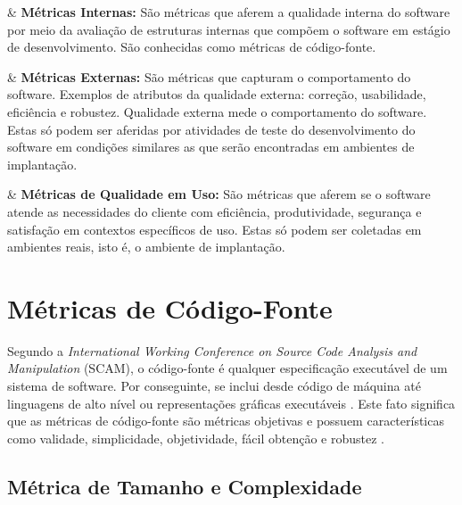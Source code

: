 \begin{easylist}[itemize]
	
		& \textbf{Métricas Internas:} 
		São métricas que aferem a qualidade interna do software por meio da 
		avaliação de estruturas internas que compõem o software em estágio de 
		desenvolvimento. São conhecidas como métricas de código-fonte.

		& \textbf{Métricas Externas:}
		São métricas que capturam o comportamento do software. Exemplos de 
		atributos da qualidade externa: correção, usabilidade, eficiência e 
		robustez. Qualidade externa mede o comportamento do software. Estas só 
		podem ser aferidas por atividades de teste do desenvolvimento do 
		software em condições similares as que serão encontradas em ambientes de
		implantação.

		& \textbf{Métricas de Qualidade em Uso:}
		São métricas que aferem se o software atende as necessidades do cliente
		com eficiência, produtividade, segurança e satisfação em contextos 
		específicos de uso. Estas só podem ser coletadas em ambientes reais, 
		isto é, o ambiente de implantação.	
			 
\end{easylist}
		
				

\section {Métricas de Código-Fonte}
\label{sec:source-code}

Segundo a \textit{International Working Conference on Source Code Analysis and 
Manipulation} (SCAM), o código-fonte é qualquer especificação executável 
de um sistema de software. Por conseguinte, se inclui desde código de máquina 
até linguagens de alto nível ou representações gráficas executáveis \cite{harman2010source}. Este fato significa que as métricas de código-fonte  são métricas objetivas e possuem características como validade, simplicidade, objetividade, fácil obtenção e robustez \cite{Mills:1999}. 


\subsection{Métrica de Tamanho e Complexidade}

